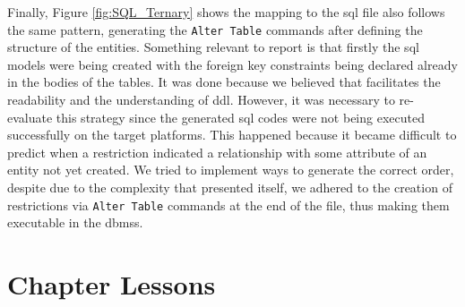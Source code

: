 Finally, Figure \ref{fig:SQL_Ternary} shows the mapping to the \ac{sql} file also follows the same pattern, generating the \texttt{Alter Table} commands after defining the structure of the entities.
Something relevant to report is that firstly the \ac{sql} models were being created with the foreign key constraints being declared already in the bodies of the tables.
It was done because we believed that facilitates the readability and the understanding of \ac{ddl}.
However, it was necessary to re-evaluate this strategy since the generated \ac{sql} codes were not being executed successfully on the target platforms.
This happened because it became difficult to predict when a restriction indicated a relationship with some attribute of an entity not yet created.
We tried to implement ways to generate the correct order, despite due to the complexity that presented itself, we adhered to the creation of restrictions via \texttt{Alter Table} commands at the end of the file, thus making them executable in the \acp{dbms}.

\section{Chapter Lessons}
 
